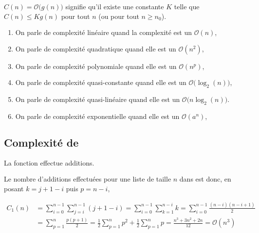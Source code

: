 $C(n) = {\mathcal O}\bigl(g(n)\bigr)$ signifie qu'il existe une constante $K$ telle que $C(n) \le K g(n)$ pour tout $n$ (ou pour tout $n \ge n_0$).
\begin{enumerate}
\item On parle de complexité linéaire quand la complexité est un  ${\mathcal O}(n)$,

\item On parle de complexité quadratique quand elle est un  ${\mathcal O}(n^2)$,

\item On parle de complexité polynomiale quand elle est un  ${\mathcal O}(n^p)$,

\item On parle de complexité quasi-constante quand elle est un  ${\mathcal O}\bigl(\log_2(n)\bigr)$,

\item On parle de complexité quasi-linéaire quand elle est un  ${\mathcal O}\bigl(n\log_2(n)\bigr)$.

\item On parle de complexité exponentielle quand elle est un  ${\mathcal O}(a^n)$,
\end{enumerate}
\subsection{Complexité de }
La fonction  effectue  additions.

Le nombre d'additions effectuées pour une liste de taille $n$ dans  est donc, en posant $k = j + 1 - i$ puis $p = n-i$,

\begin{align*}
 C_1(n) 
 &
= \sum_{i=0}^{n-1} \sum_{j=i}^{n-1} (j+1-i)
= \sum_{i=0}^{n-1} \sum_{k=1}^{n-i} k
= \sum_{i=0}^{n-1} \frac{(n-i)(n-i+1)}2
\\ &
= \sum_{p=1}^{n} \frac{p(p+1)}2
= \frac 12\sum_{p=1}^{n} p^2+\frac 12\sum_{p=1}^{n} p
=\frac{n^3+3n^2+2n}{12}={\mathcal O}(n^3)
\end{align*}

